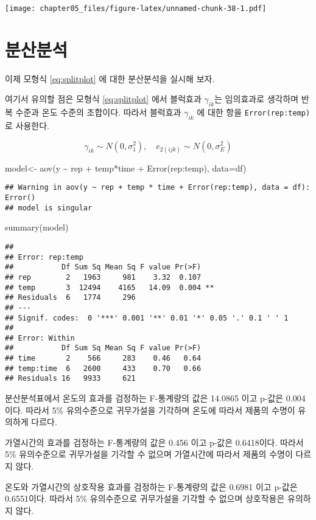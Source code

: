 \documentclass[
]{book}
\newenvironment{Shaded}{\begin{snugshade}}{\end{snugshade}}
\newcommand{\AttributeTok}[1]{\textcolor[rgb]{0.77,0.63,0.00}{#1}}
\newcommand{\FunctionTok}[1]{\textcolor[rgb]{0.00,0.00,0.00}{#1}}
\newcommand{\NormalTok}[1]{#1}
\newcommand{\OtherTok}[1]{\textcolor[rgb]{0.56,0.35,0.01}{#1}}
\newcommand{\SpecialCharTok}[1]{\textcolor[rgb]{0.00,0.00,0.00}{#1}}
\begin{document}
\texttt{[image: chapter05\_files/figure-latex/unnamed-chunk-38-1.pdf]}

\hypertarget{uxbd84uxc0b0uxbd84uxc11d-3}{%
\section{분산분석}\label{uxbd84uxc0b0uxbd84uxc11d-3}}

이제 모형식 \eqref{eq:splitplot} 에 대한 분산분석을 실시해 보자.

여기서 유의할 점은 모형식 \eqref{eq:splitplot} 에서 블럭효과 \(\gamma_{ik}\)는 임의효과로 생각하며 반복 수준과 온도 수준의 조합이다. 따라서 블럭효과 \(\gamma_{ik}\) 에 대한 항을 \texttt{Error(rep:temp)}로 사용한다.

\[ \gamma_{ik} \sim N(0,\sigma^2_1), \quad e_{2(ijk)} \sim N(0, \sigma^2_E) \]

\begin{Shaded}
\begin{Highlighting}[]
\NormalTok{model}\OtherTok{\textless{}{-}} \FunctionTok{aov}\NormalTok{(y }\SpecialCharTok{\textasciitilde{}}\NormalTok{ rep }\SpecialCharTok{+}\NormalTok{ temp}\SpecialCharTok{*}\NormalTok{time }\SpecialCharTok{+} \FunctionTok{Error}\NormalTok{(rep}\SpecialCharTok{:}\NormalTok{temp), }\AttributeTok{data=}\NormalTok{df)}
\end{Highlighting}
\end{Shaded}

\begin{verbatim}
## Warning in aov(y ~ rep + temp * time + Error(rep:temp), data = df): Error()
## model is singular
\end{verbatim}

\begin{Shaded}
\begin{Highlighting}[]
\FunctionTok{summary}\NormalTok{(model)}
\end{Highlighting}
\end{Shaded}

\begin{verbatim}
## 
## Error: rep:temp
##           Df Sum Sq Mean Sq F value Pr(>F)   
## rep        2   1963     981    3.32  0.107   
## temp       3  12494    4165   14.09  0.004 **
## Residuals  6   1774     296                  
## ---
## Signif. codes:  0 '***' 0.001 '**' 0.01 '*' 0.05 '.' 0.1 ' ' 1
## 
## Error: Within
##           Df Sum Sq Mean Sq F value Pr(>F)
## time       2    566     283    0.46   0.64
## temp:time  6   2600     433    0.70   0.66
## Residuals 16   9933     621
\end{verbatim}

분산분석표에서 온도의 효과를 검정하는 F-통계량의 값은 14.0865 이고 p-값은 0.004이다. 따라서 5\% 유의수준으로 귀무가설을 기각하며 온도에 따라서 제품의 수명이 유의하게 다르다.

가열시간의 효과를 검정하는 F-통계량의 값은 0.456 이고 p-값은 0.6418이다. 따라서 5\% 유의수준으로 귀무가설을 기각할 수 없으며 가열시간에 따라서 제품의 수명이 다르지 않다.

온도와 가열시간의 상호작용 효과를 검정하는 F-통계량의 값은 0.6981 이고 p-값은 0.6551이다. 따라서 5\% 유의수준으로 귀무가설을 기각할 수 없으며 상호작용은 유의하지 않다.

  
\end{document}
